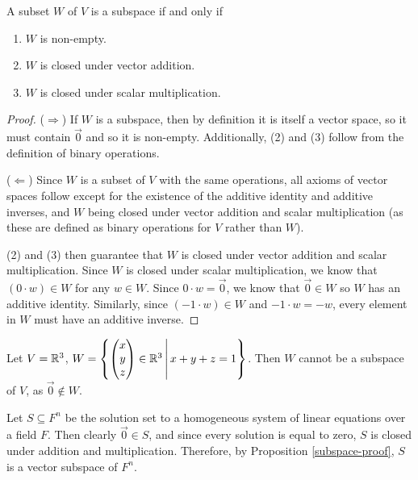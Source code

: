 \begin{prop}\label{subspace-proof}
    A subset $W$ of $V$ is a subspace if and only if
    \begin{enumerate}
        \item $W$ is non-empty.
        \item $W$ is closed under vector addition.
        \item $W$ is closed under scalar multiplication.
    \end{enumerate}
\end{prop}

\begin{proof}\proofbreak
    ($\Longrightarrow$) If $W$ is a subspace, then by definition it is itself a vector space, so it must contain $\vec{0}$ and so it is non-empty. Additionally, (2) and (3) follow from the definition of binary operations.

    ($\Longleftarrow$) Since $W$ is a subset of $V$ with the same operations, all axioms of vector spaces follow except for the existence of the additive identity and additive inverses, and $W$ being closed under vector addition and scalar multiplication (as these are defined as binary operations for $V$ rather than $W$).

    (2) and (3) then guarantee that $W$ is closed under vector addition and scalar multiplication. Since $W$ is closed under scalar multiplication, we know that $(0 \cdot w) \in W$ for any $w \in W$. Since $0 \cdot w = \vec{0}$, we know that $\vec{0} \in W$ so $W$ has an additive identity. Similarly, since $(-1 \cdot w) \in W$ and $-1 \cdot w = -w$, every element in $W$ must have an additive inverse.
\end{proof}

\begin{exmp}
    Let $V = \mathbb{R}^3$, $W = \left\{\begin{pmatrix}
            x \\ y \\ z
        \end{pmatrix} \in \mathbb{R}^3 \,\middle|\, x + y + z = 1\right\}$. Then $W$ cannot be a subspace of $V$, as $\vec{0} \notin W$.
\end{exmp}

\begin{exmp}
    Let $S \subseteq F^n$ be the solution set to a homogeneous system of linear equations over a field $F$. Then clearly $\vec{0} \in S$, and since every solution is equal to zero, $S$ is closed under addition and multiplication. Therefore, by Proposition \ref{subspace-proof}, $S$ is a vector subspace of $F^n$.
\end{exmp}

